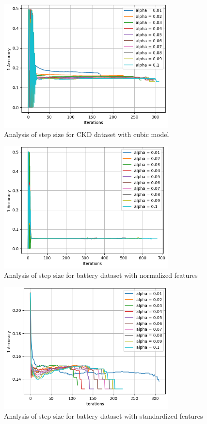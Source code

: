 \documentclass{article}
\begin{document}
\begin{figure}[H]
  \centering
  \includegraphics[width=0.8\textwidth]{CKDmodel5.png}
  \caption{Analysis of step size for CKD dataset with cubic model }
  \label{fig:quad_ckd}
\end{figure}

\begin{figure}[H]
  \centering
  \includegraphics[width=0.8\textwidth]{Batmodel1.png}
  \caption{Analysis of step size for battery dataset with normalized features}
  \label{fig:quad_battery}
\end{figure}

\begin{figure}[H]
  \centering
  \includegraphics[width=0.8\textwidth]{Batmodel2.png}
  \caption{Analysis of step size for battery dataset with standardized features}
  \label{fig:quad_battery}
\end{figure}
\end{document}
